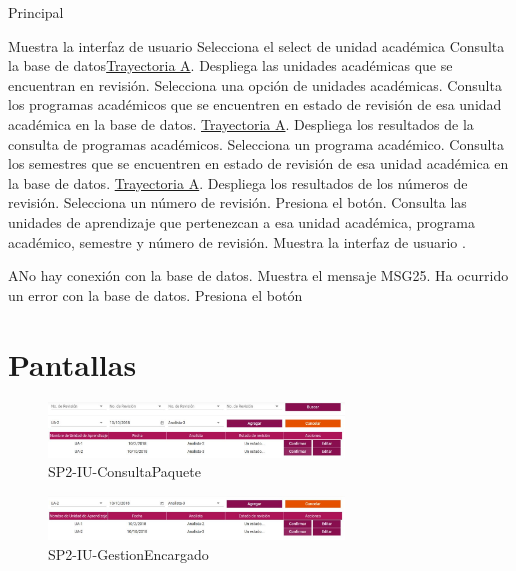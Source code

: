\begin{UCtrayectoria}{Principal}


    \UCpaso Muestra la interfaz de usuario 
    \UCpaso [\UCactor] Selecciona el select de unidad académica
    \UCpaso Consulta la base de datos\hyperref[SP2-CU5-A]{Trayectoria A}.
    \UCpaso Despliega las unidades académicas que se encuentran en revisión.
    \UCpaso [\UCactor] Selecciona una opción de unidades académicas.
    \UCpaso Consulta los programas académicos que se encuentren en estado de revisión de esa unidad académica en la base de datos. \hyperref[SP2-CU5-A]{Trayectoria A}.
    \UCpaso Despliega los resultados de la consulta de programas académicos.
    \UCpaso [\UCactor] Selecciona un programa académico.
    \UCpaso Consulta los semestres que se encuentren en estado de revisión de esa unidad académica en la base de datos. \hyperref[SP2-CU5-A]{Trayectoria A}.
    \UCpaso Despliega los resultados de los números de revisión.
    \UCpaso [\UCactor] Selecciona un número de revisión.
    \UCpaso [\UCactor] Presiona el botón. 
    \UCpaso Consulta las unidades de aprendizaje que pertenezcan a esa unidad académica, programa académico, semestre y número de revisión.
    \UCpaso Muestra la interfaz de usuario .

\end{UCtrayectoria}


\label{SP2-CU5-A}
\begin{UCtrayectoriaA}{A}{No hay conexión con la base de datos.}
    \UCpaso Muestra el mensaje MSG25. Ha ocurrido un error con la base de datos.
    \UCpaso[\UCactor] Presiona el botón 
\end{UCtrayectoriaA}

\chapter{Pantallas}
 \begin{figure}
  \centering
    \includegraphics[width=0.7\textwidth]{DCU/SP2/Pantallas/ConsultaPaquete}
  \caption{SP2-IU-ConsultaPaquete}
  \label{SP2-IU-ConsultaPaquete}
\end{figure}

 \begin{figure}
  \centering
    \includegraphics[width=0.7\textwidth]{DCU/SP2/Pantallas/GestionEncargado}
  \caption{SP2-IU-GestionEncargado}
  \label{SP2-IU-GestionEncargado}
\end{figure}


